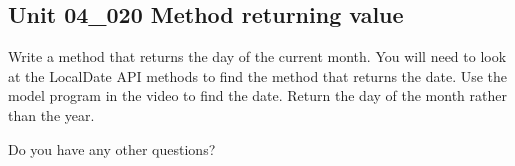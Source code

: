 \documentclass[letterpaper,12pt]{exam}
\newcommand{\unit}{Unit 04}
\begin{document}
\begin{questions}
\section*{\unit\_020 Method returning value} %

\begin{samepage}
	\question Write a method that returns the day of the current month.  You will need to look at the LocalDate API methods to find the method that returns the date.  Use the model program in the video to find the date.  Return the day of the month rather than the year.
	\vspace{55mm}
\end{samepage}


\begin{samepage}
	\question Do you have any other questions?
	\vspace{30mm}
\end{samepage}

\end{questions}
\end{document}
